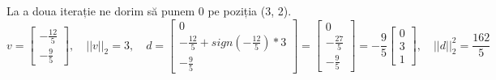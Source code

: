 \documentclass{exam}
\begin{document}
La a doua iterație ne dorim să punem 0 pe poziția (3, 2).
\begin{equation*}
	v = \begin{bmatrix} -\frac{12}{5} \\ -\frac{9}{5} \end{bmatrix}, \quad ||v||_2 = 3, \quad d = \begin{bmatrix} 0 \\ -\frac{12}{5} + sign(-\frac{12}{5}) * 3 \\ -\frac{9}{5} \end{bmatrix} = \begin{bmatrix} 0 \\ -\frac{27}{5} \\ -\frac{9}{5} \end{bmatrix} = - \frac{9}{5} \begin{bmatrix} 0 \\ 3 \\ 1 \end{bmatrix}, \quad ||d||_2^2 = \frac{162}{5}
\end{equation*}
\end{document}
